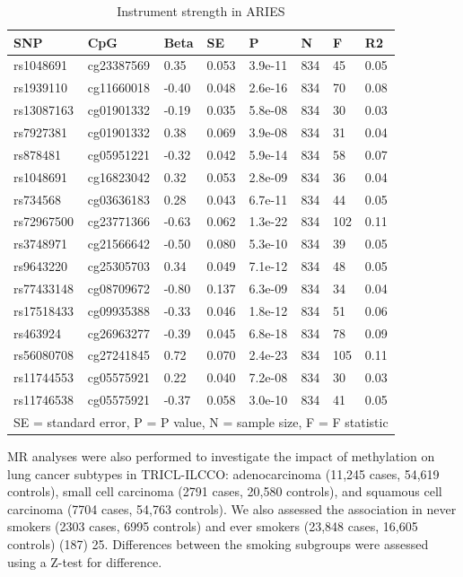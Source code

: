 \documentclass[11pt,oneside]{bristolthesis}
\begin{document}
\begin{longtable}[t]{llllllll}
\caption{\label{tab:instrument-strength}Instrument strength in ARIES}\\
\toprule
SNP & CpG & Beta & SE & P & N & F & R2\\
\midrule
rs1048691 & cg23387569 & 0.35 & 0.053 & 3.9e-11 & 834 & 45 & 0.05\\
rs1939110 & cg11660018 & -0.40 & 0.048 & 2.6e-16 & 834 & 70 & 0.08\\
rs13087163 & cg01901332 & -0.19 & 0.035 & 5.8e-08 & 834 & 30 & 0.03\\
rs7927381 & cg01901332 & 0.38 & 0.069 & 3.9e-08 & 834 & 31 & 0.04\\
rs878481 & cg05951221 & -0.32 & 0.042 & 5.9e-14 & 834 & 58 & 0.07\\
\addlinespace
rs1048691 & cg16823042 & 0.32 & 0.053 & 2.8e-09 & 834 & 36 & 0.04\\
rs734568 & cg03636183 & 0.28 & 0.043 & 6.7e-11 & 834 & 44 & 0.05\\
rs72967500 & cg23771366 & -0.63 & 0.062 & 1.3e-22 & 834 & 102 & 0.11\\
rs3748971 & cg21566642 & -0.50 & 0.080 & 5.3e-10 & 834 & 39 & 0.05\\
rs9643220 & cg25305703 & 0.34 & 0.049 & 7.1e-12 & 834 & 48 & 0.05\\
\addlinespace
rs77433148 & cg08709672 & -0.80 & 0.137 & 6.3e-09 & 834 & 34 & 0.04\\
rs17518433 & cg09935388 & -0.33 & 0.046 & 1.8e-12 & 834 & 51 & 0.06\\
rs463924 & cg26963277 & -0.39 & 0.045 & 6.8e-18 & 834 & 78 & 0.09\\
rs56080708 & cg27241845 & 0.72 & 0.070 & 2.4e-23 & 834 & 105 & 0.11\\
rs11744553 & cg05575921 & 0.22 & 0.040 & 7.2e-08 & 834 & 30 & 0.03\\
\addlinespace
rs11746538 & cg05575921 & -0.37 & 0.058 & 3.0e-10 & 834 & 41 & 0.05\\
\bottomrule
\multicolumn{8}{l}{SE = standard error, P = P value, N = sample size, F = F statistic}\\
\end{longtable}
MR analyses were also performed to investigate the impact of methylation on lung cancer subtypes in TRICL-ILCCO: adenocarcinoma (11,245 cases, 54,619 controls), small cell carcinoma (2791 cases, 20,580 controls), and squamous cell carcinoma (7704 cases, 54,763 controls). We also assessed the association in never smokers (2303 cases, 6995 controls) and ever smokers (23,848 cases, 16,605 controls) (187) 25. Differences between the smoking subgroups were assessed using a Z-test for difference.
\end{document}
